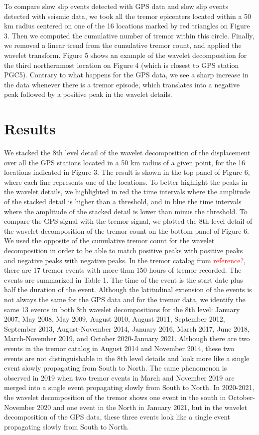 \documentclass{article}
\begin{document}
To compare slow slip events detected with GPS data and slow slip events detected with seismic data, we took all the tremor epicenters located within a 50 km radius centered on one of the 16 locations marked by red triangles on Figure 3. Then we computed the cumulative number of tremor within this circle. Finally, we removed a linear trend from the cumulative tremor count, and applied the wavelet transform. Figure 5 shows an example of the wavelet decomposition for the third northernmost location on Figure 4 (which is closest to GPS station PGC5). Contrary to what happens for the GPS data, we see a sharp increase in the data whenever there is a tremor episode, which translates into a negative peak followed by a positive peak in the wavelet details.

\section{Results}

We stacked the 8th level detail of the wavelet decomposition of the displacement over all the GPS stations located in a 50 km radius of a given point, for the 16 locations indicated in Figure 3. The result is shown in the top panel of Figure 6, where each line represents one of the locations. To better highlight the peaks in the wavelet details, we highlighted in red the time intervals where the amplitude of the stacked detail is higher than a threshold, and in blue the  time intervals where the amplitude of the stacked detail is lower than minus the threshold. To compare the GPS signal with the tremor signal, we plotted the 8th level detail of the wavelet decomposition of the tremor count on the bottom panel of Figure 6. We used the opposite of the cumulative tremor count for the wavelet decomposition in order to be able to match positive peaks with positive peaks and negative peaks with negative peaks. In the tremor catalog from \textcolor{red}{reference?}, there are 17 tremor events with more than 150 hours of tremor recorded. The events are summarized in Table 1. The time of the event is the start date plus half the duration of the event. Although the latitudinal extension of the events is not always the same for the GPS data and for the tremor data, we identify the same 13 events in both 8th wavelet decompositions for the 8th level: January 2007, May 2008, May 2009, August 2010, August 2011, September 2012, September 2013, August-November 2014, January 2016, March 2017, June 2018, March-November 2019, and October 2020-January 2021. Although there are two events in the tremor catalog in August 2014 and November 2014, these two events are not distinguishable in the 8th level details and look more like a single event slowly propagating from South to North. The same phenomenon is observed in 2019 when two tremor events in March and November 2019 are merged into a single event propagating slowly from South to North. In 2020-2021, the wavelet decomposition of the tremor shows one event in the south in October-November 2020 and one event in the North in January 2021, but in the wavelet decomposition of the GPS data, these three events look like a single event propagating slowly from South to North. \\
\end{document}
